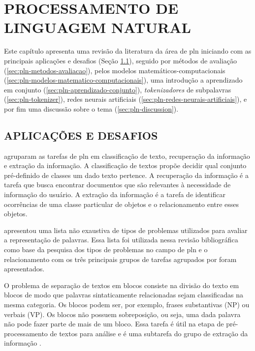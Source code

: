 \chapter{PROCESSAMENTO DE LINGUAGEM NATURAL}
\label{chp:pln}

Este capítulo apresenta uma revisão da literatura da área de \glsdesc{pln} iniciando com as principais aplicações e desafios (Seção \ref{sec:pln-aplicacoes-desafios}), seguido por métodos de avaliação (\ref{sec:pln-metodos-avaliacao}), pelos modelos matemáticos-computacionais (\ref{sec:pln-modelos-matematico-computacionais}), uma introdução a aprendizado em conjunto (\ref{sec:pln-aprendizado-conjunto}), \textit{tokenizadores} de subpalavras (\ref{sec:pln-tokenizer}), redes neurais artificiais (\ref{sec:pln-redes-neurais-artificiais}), e por fim uma discussão sobre o tema (\ref{sec:pln-discussion}).

\section{APLICAÇÕES E DESAFIOS}
\label{sec:pln-aplicacoes-desafios}


\textcite{Russell2009Artificial} agruparam as tarefas de \gls{pln} em classificação de texto, recuperação da informação e extração da informação. A classificação de textos propõe decidir qual conjunto pré-definido de classes um dado texto pertence. A recuperação da informação é a tarefa que busca encontrar documentos que são relevantes à necessidade de informação do usuário. A extração da informação é a tarefa de identificar ocorrências de uma classe particular de objetos e o relacionamento entre esses objetos.

\textcite{Bakarov2018SurveyWordEmbeddings} apresentou uma lista não exaustiva de tipos de problemas utilizados para avaliar a representação de palavras. Essa lista foi utilizada nessa revisão bibliográfica como base da pesquisa dos tipos de problemas no campo de \gls{pln} e o relacionamento com os três principais grupos de tarefas agrupados por \textcite{Russell2009Artificial} foram apresentados.

O problema de separação de textos em blocos consiste na divisão do texto em blocos de modo que palavras sintaticamente relacionadas sejam classificadas na mesma categoria. Os blocos podem ser, por exemplo, frases substantivas (NP) ou verbais (VP). Os blocos não possuem sobreposição, ou seja, uma dada palavra não pode fazer parte de mais de um bloco. Essa tarefa é útil na etapa de pré-processamento de textos para análise e é uma subtarefa do grupo de extração da informação \cite{Tjong2000Chunking}. 

